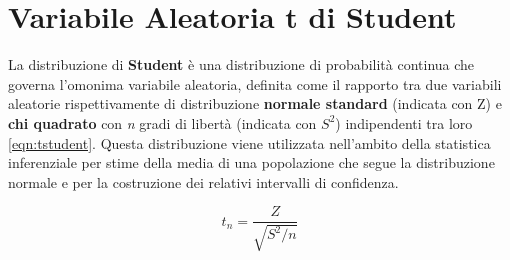 \chapter[Variabile Aleatoria t di Student]{Variabile Aleatoria t di Student}

La distribuzione di \textbf{Student} è una distribuzione di probabilità continua che governa l'omonima variabile aleatoria, definita come il rapporto tra due variabili aleatorie rispettivamente di distribuzione \textbf{normale standard} (indicata con Z) e \textbf{chi quadrato} con \textit{n} gradi di libertà (indicata con $S^2$) indipendenti tra loro \eqref{eqn:tstudent}. Questa distribuzione viene utilizzata nell'ambito della statistica inferenziale per stime della media di una popolazione che segue la distribuzione normale e per la costruzione dei relativi intervalli di confidenza.

\begin{equation}
\label{eqn:tstudent}
t_{n} = \frac{Z}{\sqrt{{S^2}\slash{n}}}
\end{equation}
